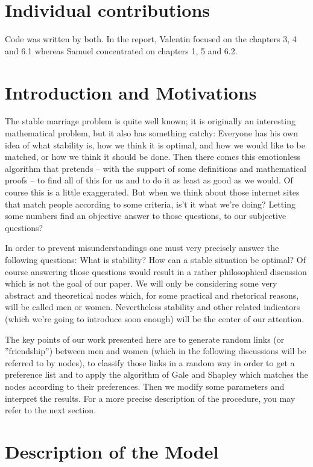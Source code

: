 \documentclass[11pt]{article}
\begin{document}
\section{Individual contributions} %

Code was written by both. In the report, Valentin focused on the chapters 3, 4 and 6.1 whereas Samuel concentrated on chapters 1, 5 and 6.2.

\section{Introduction and Motivations}

The stable marriage problem is quite well known; it is originally an interesting mathematical 
problem, but it also has something catchy: Everyone has his own idea of what stability is, how we 
think it is optimal, and how we would like to be matched, or how we think it should be done. Then there comes this emotionless algorithm
that pretends -- with the support of some definitions and mathematical proofs -- to find all of this for us and to do it as least as good
as we would. Of course this is a little exaggerated. But when we think about those internet sites that match people according to some  criteria,
is't it what we're doing? Letting some numbers find an objective answer to those questions, to our subjective questions?

In order to prevent misunderstandings one must very precisely answer the following questions: What is stability? How can a stable situation be optimal?
Of course answering those questions would result in a rather philosophical discussion which is not the goal of our paper.
We will only be considering some very abstract and theoretical nodes which, for some practical and rhetorical reasons, will be called men or women.
Nevertheless stability and other related indicators (which we’re going to introduce soon enough) will be the center of our attention.

The key points of our work presented here are to generate random links (or ''friendship'') between men and women (which in the following 
discussions will be referred to by nodes), to classify those links in a random way in order to get a preference list and to apply the algorithm 
of Gale and Shapley which matches the nodes according to their preferences. Then we modify some parameters and interpret the results. For a more precise 
description of the procedure, you may refer to the next section.

\section{Description of the Model}
\end{document}
